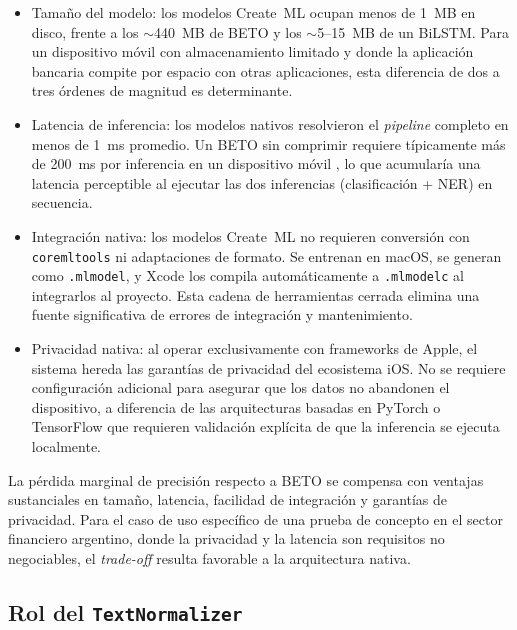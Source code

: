 \begin{itemize}
    \item Tamaño del modelo: los modelos Create~ML ocupan menos de 1~MB en disco, frente a los $\sim$440~MB de BETO y los $\sim$5--15~MB de
    un BiLSTM. Para un dispositivo móvil con almacenamiento limitado y donde la aplicación bancaria compite por espacio con otras aplicaciones, esta
    diferencia de dos a tres órdenes de magnitud es determinante.

    \item Latencia de inferencia: los modelos nativos resolvieron el \textit{pipeline} completo en menos de 1~ms promedio. Un BETO sin comprimir
    requiere típicamente más de 200~ms por inferencia en un dispositivo móvil \citep{sun2020mobilebert}, lo que acumularía una latencia perceptible al
    ejecutar las dos inferencias (clasificación + NER) en secuencia.

    \item Integración nativa: los modelos Create~ML no requieren conversión con \texttt{coremltools} ni adaptaciones de formato. Se
    entrenan en macOS, se generan como \texttt{.mlmodel}, y Xcode los compila automáticamente a \texttt{.mlmodelc} al integrarlos al proyecto. Esta
    cadena de herramientas cerrada elimina una fuente significativa de errores de integración y mantenimiento.

    \item Privacidad nativa: al operar exclusivamente con frameworks de Apple, el sistema hereda las garantías de privacidad del ecosistema iOS.
    No se requiere configuración adicional para asegurar que los datos no abandonen el dispositivo, a diferencia de las arquitecturas basadas en
    PyTorch o TensorFlow que requieren validación explícita de que la inferencia se ejecuta localmente.
\end{itemize}

La pérdida marginal de precisión respecto a BETO se compensa con ventajas sustanciales en tamaño, latencia, facilidad de integración y
garantías de privacidad. Para el caso de uso específico de una prueba de concepto en el sector financiero argentino, donde la privacidad y la
latencia son requisitos no negociables, el \textit{trade-off} resulta favorable a la arquitectura nativa.

\subsection{Rol del \texttt{TextNormalizer}}
\label{subsec:rol-normalizer}

